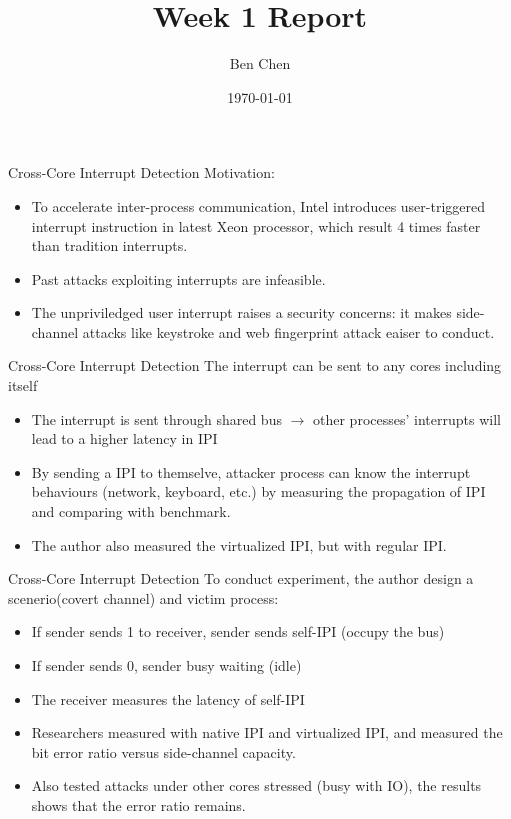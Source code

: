 \documentclass{beamer}
\title{Week 1 Report}
\author{Ben Chen}
\institute{Dept of Computer Science and Engineering, SUSTech}
\date{\today}
\begin{document}
\frame{\titlepage}

\begin{frame}{Cross-Core Interrupt Detection\cite{cross-core}}
Motivation:
\begin{itemize}[<+->]
  \item To accelerate inter-process communication, Intel introduces user-triggered interrupt instruction in latest Xeon processor, which result 4 times faster than tradition interrupts.
  \item Past attacks exploiting interrupts are infeasible.
  \item The unpriviledged user interrupt raises a security concerns: it makes side-channel attacks like keystroke and web fingerprint attack eaiser to conduct.
\end{itemize}
\end{frame}

\begin{frame}{Cross-Core Interrupt Detection\cite{cross-core}}
The interrupt can be sent to any cores including itself
\begin{itemize}[<+->]
  \item The interrupt is sent through shared bus $\rightarrow$ other processes' interrupts will lead to a higher latency in IPI
  \item By sending a IPI to themselve, attacker process can know the interrupt behaviours (network, keyboard, etc.) by measuring the propagation of IPI and comparing with benchmark.
  \item The author also measured the virtualized IPI, but with regular IPI.
\end{itemize}
\end{frame}

\begin{frame}{Cross-Core Interrupt Detection\cite{cross-core}}
To conduct experiment, the author design a scenerio(covert channel) and victim process:
\begin{itemize}[<+->]
  \item If sender sends 1 to receiver, sender sends self-IPI (occupy the bus)
  \item If sender sends 0, sender busy waiting (idle)
  \item The receiver measures the latency of self-IPI
  \item Researchers measured with native IPI and virtualized IPI, and measured the bit error ratio versus side-channel capacity.
  \item Also tested attacks under other cores stressed (busy with IO), the results shows that the error ratio remains.
\end{itemize}
\end{frame}
\end{document}
